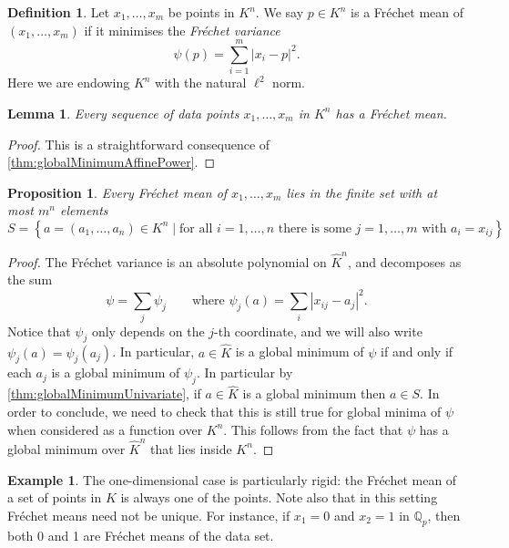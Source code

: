 \documentclass[10pt]{article}
\newtheorem{lemma}[theorem]{Lemma}
\newtheorem{proposition}[theorem]{Proposition}
\theoremstyle{definition}
\newtheorem{definition}[theorem]{Definition}
\newtheorem{example}[theorem]{Example}
\begin{document}
\begin{definition}
    Let $x_1, \dotsc, x_m$ be points in $K^n$. We say $p \in K^n$ is a Fr\'echet mean of $(x_1, \dotsc, x_m)$ if it minimises the \emph{Fr\'echet variance}
    $$
        \psi(p) = \sum_{i=1}^m |x_i - p|^2.
    $$
    Here we are endowing $K^n$ with the natural $\ell^2$ norm.
\end{definition}

\begin{lemma}
    Every sequence of data points $x_1, \dotsc, x_m$ in $K^n$ has a Fr\'echet mean.
\end{lemma}

\begin{proof}
    This is a straightforward consequence of \cref{thm:globalMinimumAffinePower}.
\end{proof}

\begin{proposition}
    Every Fr\'echet mean of $x_1, \dotsc, x_m$ lies in the finite set with at most $m^n$ elements
    $$
    S = \left\{ a=(a_1,\dots,a_n) \in K^n \mid \text {for all } i=1,\dots,n \text{ there is some } j=1,\dots,m \text{ with } a_i = x_{ij} \right\}
    $$
\end{proposition}

\begin{proof}
    The Fr\'echet variance is an absolute polynomial on $\hat{K}^n$, and decomposes as the sum
    $$
        \psi = \sum_j \psi_j\qquad \text{where } \psi_j(a) = \sum_i |x_{ij} - a_j|^2.
    $$
    Notice that $\psi_j$ only depends on the $j$-th coordinate, and we will also write $\psi_j(a) = \psi_j(a_j)$. In particular, $a \in \hat{K}$ is a global minimum of $\psi$ if and only if each $a_j$ is a global minimum of $\psi_j$. In particular by \cref{thm:globalMinimumUnivariate}, if $a \in \hat{K}$ is a global minimum then $a \in S$. In order to conclude, we need to check that this is still true for global minima of $\psi$ when considered as a function over $K^n$. This follows from the fact that $\psi$ has a global minimum over $\hat{K}^n$ that lies inside $K^n$.
\end{proof}


\begin{example}
    The one-dimensional case is particularly rigid: the Fr\'echet mean of a set of points in $K$ is always one of the points. Note also that in this setting Fr\'echet means need not be unique. For instance, if $x_1 = 0$ and $x_2 = 1$ in $\mathbb{Q}_p$, then both 0 and 1 are Fr\'echet means of the data set.
\end{example}
\end{document}
